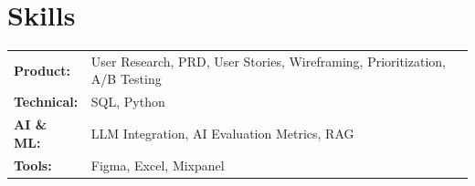\documentclass[a4paper,11pt]{article}
\begin{document}
\vspace{5pt}



\section{Skills}

\begin{tabularx}{\linewidth}{@{}l X@{}}

\textbf{Product:} &
User Research, PRD, User Stories, Wireframing, Prioritization, A/B Testing \\[3pt]

\textbf{Technical:} &
SQL, Python\\[3pt]

\textbf{AI \& ML:} &
LLM Integration, AI Evaluation Metrics, RAG \\[3pt]

\textbf{Tools:} &
Figma, Excel, Mixpanel \\

\end{tabularx}
\end{document}
